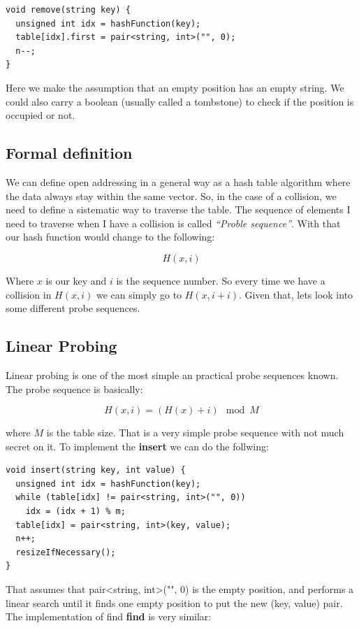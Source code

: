 \begin{lstlisting}
void remove(string key) {
  unsigned int idx = hashFunction(key);
  table[idx].first = pair<string, int>("", 0);
  n--;
}
\end{lstlisting}

Here we make the assumption that an empty position has an empty string. We could also carry a boolean (usually called a tombstone) to check if the position is occupied or not. 

\subsection{Formal definition}

We can define open addressing in a general way as a hash table algorithm where the data always stay within the same vector. So, in the case of a collision, we need to define a sistematic way to traverse the table. The sequence of elements I need to traverse when I have a collision is called \textit{``Proble sequence''}. With that our hash function would change to the following:

\[ H(x, i) \]

Where \( x \) is our key and \( i \) is the sequence number. So every time we have a collision in \( H(x, i) \) we can simply go to \( H(x, i + i) \). Given that, lets look into some different probe sequences.

\subsection{Linear Probing}

Linear probing is one of the most simple an practical probe sequences known. The probe sequence is basically:

\[ H(x, i) = (H(x) + i) \mod M \]

where \( M \) is the table size. That is a very simple probe sequence with not much secret on it. To implement the \textbf{insert} we can do the follwing:

\begin{lstlisting}
void insert(string key, int value) {
  unsigned int idx = hashFunction(key);
  while (table[idx] != pair<string, int>("", 0))
    idx = (idx + 1) % m;      
  table[idx] = pair<string, int>(key, value);
  n++;
  resizeIfNecessary();
}
\end{lstlisting}

That assumes that pair<string, int>("", 0) is the empty position, and performs a linear search until it finds one empty position to put the new (key, value) pair. The implementation of find \textbf{find} is very similar:

